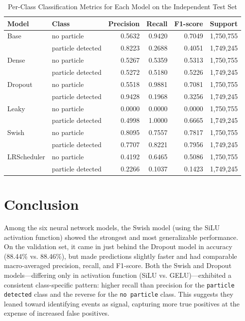 \documentclass{article}      %
\begin{document}
\begin{table}[H]
    \centering
    \caption{Per-Class Classification Metrics for Each Model on the Independent Test Set}
    \begin{tabular}{llrrrr}
    \arrayrulecolor{black}
    \toprule
    \textbf{Model} & \textbf{Class} & \textbf{Precision} & \textbf{Recall} & \textbf{F1-score} & \textbf{Support} \\
    \midrule
    Base & no particle         & 0.5632 & 0.9420 & 0.7049 & 1{,}750{,}755 \\
    & particle detected   & 0.8223 & 0.2688 & 0.4051 & 1{,}749{,}245 \\
    \midrule
    Dense & no particle         & 0.5267 & 0.5359 & 0.5313 & 1{,}750{,}755 \\
    & particle detected   & 0.5272 & 0.5180 & 0.5226 & 1{,}749{,}245 \\
    \midrule
    Dropout & no particle         & 0.5518 & 0.9881 & 0.7081 & 1{,}750{,}755 \\
    & particle detected   & 0.9428 & 0.1968 & 0.3256 & 1{,}749{,}245 \\
    \midrule
    Leaky & no particle         & 0.0000 & 0.0000 & 0.0000 & 1{,}750{,}755 \\
    & particle detected   & 0.4998 & 1.0000 & 0.6665 & 1{,}749{,}245 \\
    \midrule
    Swish & no particle         & 0.8095 & 0.7557 & 0.7817 & 1{,}750{,}755 \\
    & particle detected   & 0.7707 & 0.8221 & 0.7956 & 1{,}749{,}245 \\
    \midrule
    LRScheduler & no particle         & 0.4192 & 0.6465 & 0.5086 & 1{,}750{,}755 \\
    & particle detected   & 0.2266 & 0.1037 & 0.1423 & 1{,}749{,}245 \\
    \bottomrule
    \end{tabular}
    \label{table:test_metrics_by_class}
\end{table}

\section{Conclusion}

Among the six neural network models, the Swish model (using the SiLU activation function) showed the strongest and most generalizable performance. On the validation set, it came in just behind the Dropout model in accuracy (88.44\% vs. 88.46\%), but made predictions slightly faster and had comparable macro-averaged precision, recall, and F1-score. Both the Swish and Dropout models---differing only in activation function (SiLU vs. GELU)---exhibited a consistent class-specific pattern: higher recall than precision for the \texttt{particle detected} class and the reverse for the \texttt{no particle} class. This suggests they leaned toward identifying events as signal, capturing more true positives at the expense of increased false positives.
\end{document}

